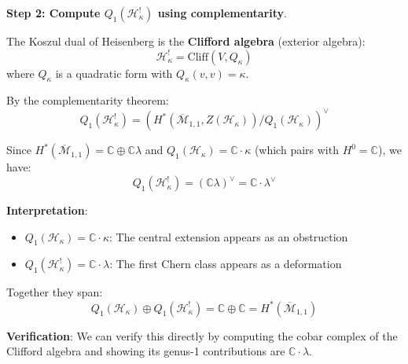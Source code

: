 \begin{example}
\textbf{Step 2: Compute $Q_1(\mathcal{H}_\kappa^!)$ using complementarity}.

The Koszul dual of Heisenberg is the \textbf{Clifford algebra} (exterior algebra):
\begin{equation}
\mathcal{H}_\kappa^! = \text{Cliff}(V, Q_\kappa)
\end{equation}
where $Q_\kappa$ is a quadratic form with $Q_\kappa(v, v) = \kappa$.

By the complementarity theorem:
\begin{equation}
Q_1(\mathcal{H}_\kappa^!) = \left(H^*(\overline{\mathcal{M}}_{1,1}, Z(\mathcal{H}_\kappa)) 
/ Q_1(\mathcal{H}_\kappa)\right)^\vee
\end{equation}

Since $H^*(\overline{\mathcal{M}}_{1,1}) = \mathbb{C} \oplus \mathbb{C}\lambda$ and 
$Q_1(\mathcal{H}_\kappa) = \mathbb{C} \cdot \kappa$ (which pairs with $H^0 = \mathbb{C}$), 
we have:
\begin{equation}
Q_1(\mathcal{H}_\kappa^!) = (\mathbb{C}\lambda)^\vee = \mathbb{C} \cdot \lambda^\vee
\end{equation}

\textbf{Interpretation}:
\begin{itemize}
\item $Q_1(\mathcal{H}_\kappa) = \mathbb{C} \cdot \kappa$: The central extension 
appears as an obstruction
\item $Q_1(\mathcal{H}_\kappa^!) = \mathbb{C} \cdot \lambda$: The first Chern class 
appears as a deformation
\end{itemize}

Together they span:
\begin{equation}
Q_1(\mathcal{H}_\kappa) \oplus Q_1(\mathcal{H}_\kappa^!) = \mathbb{C} \oplus \mathbb{C} 
= H^*(\overline{\mathcal{M}}_{1,1})
\end{equation}

\textbf{Verification}: We can verify this directly by computing the cobar complex of 
the Clifford algebra and showing its genus-1 contributions are $\mathbb{C} \cdot \lambda$.
\end{example}

